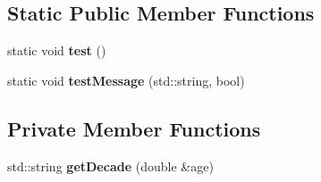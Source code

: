 \subsection*{Static Public Member Functions}
\begin{DoxyCompactItemize}
\item 
\mbox{\label{classdisease_a8644518f31d29b005037165360968ecb}} 
static void {\bfseries test} ()
\item 
\mbox{\label{classdisease_a7ca663d0151be8444ff0c79e0439450e}} 
static void {\bfseries test\+Message} (std\+::string, bool)
\end{DoxyCompactItemize}
\subsection*{Private Member Functions}
\begin{DoxyCompactItemize}
\item 
\mbox{\label{classdisease_ac4ba6bb0b1c4d7812623af9e5a1a382b}} 
std\+::string {\bfseries get\+Decade} (double \&age)
\end{DoxyCompactItemize}
